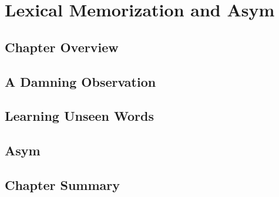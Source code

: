 \chapter{Lexical Memorization and Asym}
\label{ch:lexmem}

\section{Chapter Overview}

\section{A Damning Observation}

\section{Learning Unseen Words}

\section{Asym}

\section{Chapter Summary}

